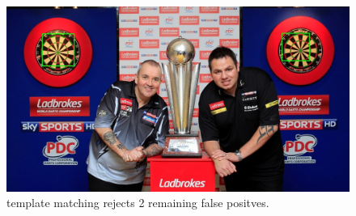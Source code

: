 \documentclass[conference]{IEEEtran}
\begin{document}
\par 
\begin{figure}[htbp]
\begin{center}
\includegraphics[width=0.8\linewidth]{images/template_merit.jpg}
\caption{template matching rejects 2 remaining false positves.}
\label{default}
\end{center}
\end{figure}
\end{document}

